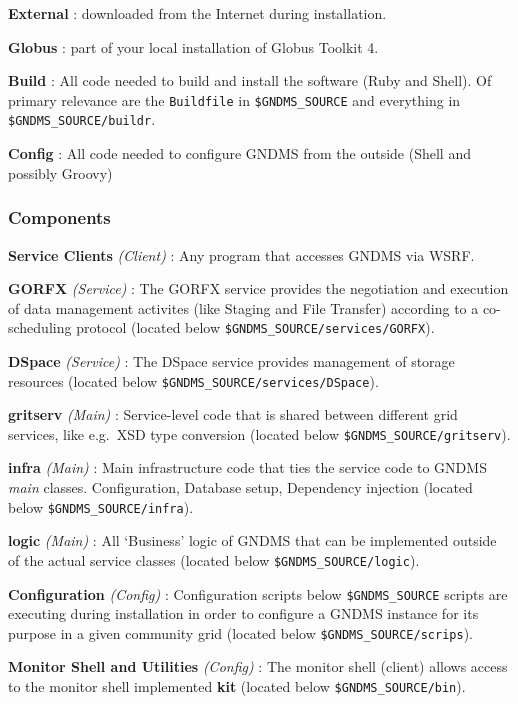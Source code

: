 \documentclass{article}
\begin{document}
\textbf{External} : downloaded from the Internet during
installation.

\textbf{Globus} : part of your local installation of Globus Toolkit
4.

\textbf{Build} : All code needed to build and install the software
(Ruby and Shell). Of primary relevance are the \verb!Buildfile! in
\verb!$GNDMS_SOURCE! and everything in
\verb!$GNDMS_SOURCE/buildr!.

\textbf{Config} : All code needed to configure GNDMS from the
outside (Shell and possibly Groovy)

\subsubsection{Components}

\textbf{Service Clients} \emph{(Client)} : Any program that
accesses GNDMS via WSRF.

\textbf{GORFX} \emph{(Service)} : The GORFX service provides the
negotiation and execution of data management activites (like
Staging and File Transfer) according to a co-scheduling protocol
(located below \verb!$GNDMS_SOURCE/services/GORFX!).

\textbf{DSpace} \emph{(Service)} : The DSpace service provides
management of storage resources (located below
\verb!$GNDMS_SOURCE/services/DSpace!).

\textbf{gritserv} \emph{(Main)} : Service-level code that is shared
between different grid services, like e.g.~XSD type conversion
(located below \verb!$GNDMS_SOURCE/gritserv!).

\textbf{infra} \emph{(Main)} : Main infrastructure code that ties
the service code to GNDMS \emph{main} classes. Configuration,
Database setup, Dependency injection (located below
\verb!$GNDMS_SOURCE/infra!).

\textbf{logic} \emph{(Main)} : All `Business' logic of GNDMS that
can be implemented outside of the actual service classes (located
below \verb!$GNDMS_SOURCE/logic!).

\textbf{Configuration} \emph{(Config)} : Configuration scripts
below \verb!$GNDMS_SOURCE! scripts are executing during
installation in order to configure a GNDMS instance for its purpose
in a given community grid (located below
\verb!$GNDMS_SOURCE/scrips!).

\textbf{Monitor Shell and Utilities} \emph{(Config)} : The monitor
shell (client) allows access to the monitor shell implemented
\textbf{kit} (located below \verb!$GNDMS_SOURCE/bin!).
\end{document}
